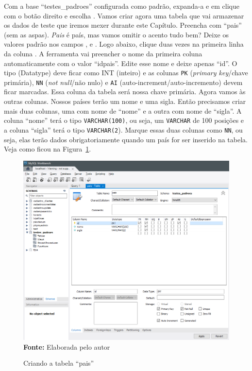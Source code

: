 Com a base ``testes\_padroes'' configurada como padrão, expanda-a e em  clique com o botão direito e escolha . Vamos criar agora uma tabela que vai armazenar os dados de teste que iremos mexer durante este Capítulo. Preencha  com ``pais'' (sem as aspas). \textit{Pais} é país, mas vamos omitir o acento tudo bem? Deixe os valores padrão nos campos ,  e . Logo abaixo, clique duas vezes na primeira linha da coluna . A ferramenta vai preencher o nome da primeira coluna automaticamente com o valor ``idpais''. Edite esse nome e deixe apenas ``id''. O tipo (Datatype) deve ficar como INT (inteiro) e as colunas \texttt{PK} (\textit{primary key}/chave primária), \texttt{NN} (\textit{not null}/não nulo) e \texttt{AI} (auto-increment/auto-incremento) devem ficar marcadas. Essa coluna da tabela será nossa chave primária. Agora vamos às outras colunas. Nossos países terão um nome e uma sigla. Então precisamos criar mais duas colunas, uma com nome de ``nome'' e a outra com nome de ``sigla''. A coluna ``nome'' terá o tipo \texttt{VARCHAR(100)}, ou seja, um \texttt{VARCHAR} de 100 posições e a coluna ``sigla'' terá o tipo \texttt{VARCHAR(2}). Marque essas duas colunas como \texttt{NN}, ou seja, elas terão dados obrigatoriamente quando um país for ser inserido na tabela. Veja como ficou na Figura~\ref{fig:cap04CriandoTabelaPais}.

\FloatBarrier
\begin{figure}[!htbp]
    \centering
    \caption{Criando a tabela ``pais''}
    \includegraphics[scale=0.6]{imagens/cap04CriandoTabelaPais}
    \\\textbf{Fonte:} Elaborada pelo autor
    \label{fig:cap04CriandoTabelaPais}
\end{figure}
\FloatBarrier

